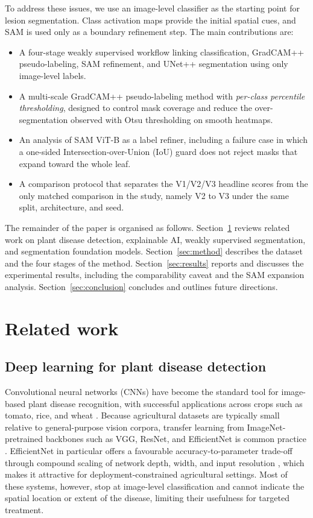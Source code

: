 \documentclass[final,5p,times,twocolumn,authoryear]{elsarticle}
\begin{document}
To address these issues, we use an image-level classifier as the starting point for lesion segmentation. Class activation maps provide the initial spatial cues, and SAM is used only as a boundary refinement step. The main contributions are:
\begin{itemize}
\item A four-stage weakly supervised workflow linking classification, GradCAM++ pseudo-labeling, SAM refinement, and UNet++ segmentation using only image-level labels.
\item A multi-scale GradCAM++ pseudo-labeling method with \emph{per-class percentile thresholding}, designed to control mask coverage and reduce the over-segmentation observed with Otsu thresholding on smooth heatmaps.
\item An analysis of SAM ViT-B as a label refiner, including a failure case in which a one-sided Intersection-over-Union (IoU) guard does not reject masks that expand toward the whole leaf.
\item A comparison protocol that separates the V1/V2/V3 headline scores from the only matched comparison in the study, namely V2 to V3 under the same split, architecture, and seed.
\end{itemize}

The remainder of the paper is organised as follows. Section~\ref{sec:related} reviews related work on plant disease detection, explainable AI, weakly supervised segmentation, and segmentation foundation models. Section~\ref{sec:method} describes the dataset and the four stages of the method. Section~\ref{sec:results} reports and discusses the experimental results, including the comparability caveat and the SAM expansion analysis. Section~\ref{sec:conclusion} concludes and outlines future directions.

\section{Related work}
\label{sec:related}

\subsection{Deep learning for plant disease detection}

Convolutional neural networks (CNNs) have become the standard tool for image-based plant disease recognition, with successful applications across crops such as tomato, rice, and wheat \citep{mohanty2016using, ferentinos2018deep}. Because agricultural datasets are typically small relative to general-purpose vision corpora, transfer learning from ImageNet-pretrained backbones such as VGG, ResNet, and EfficientNet is common practice \citep{deng2009imagenet, tan2019efficientnet}. EfficientNet in particular offers a favourable accuracy-to-parameter trade-off through compound scaling of network depth, width, and input resolution \citep{tan2019efficientnet}, which makes it attractive for deployment-constrained agricultural settings. Most of these systems, however, stop at image-level classification and cannot indicate the spatial location or extent of the disease, limiting their usefulness for targeted treatment.
\end{document}
